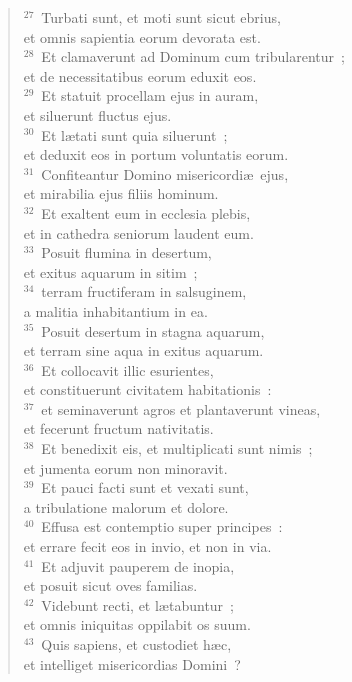 \begin{flushleft}
\begin{verse}
${}^{27}$~Turbati sunt, et moti sunt sicut ebrius,\\ et omnis sapientia eorum devorata est.\\
${}^{28}$~Et clamaverunt ad Dominum cum tribularentur~;\\ et de necessitatibus eorum eduxit eos.\\
${}^{29}$~Et statuit procellam ejus in auram,\\ et siluerunt fluctus ejus.\\
${}^{30}$~Et l\ae tati sunt quia siluerunt~;\\ et deduxit eos in portum voluntatis eorum.\\
${}^{31}$~Confiteantur Domino misericordi\ae\ ejus,\\ et mirabilia ejus filiis hominum.\\
${}^{32}$~Et exaltent eum in ecclesia plebis,\\ et in cathedra seniorum laudent eum.\\
${}^{33}$~Posuit flumina in desertum,\\ et exitus aquarum in sitim~;\\
${}^{34}$~terram fructiferam in salsuginem,\\ a malitia inhabitantium in ea.\\
${}^{35}$~Posuit desertum in stagna aquarum,\\ et terram sine aqua in exitus aquarum.\\
${}^{36}$~Et collocavit illic esurientes,\\ et constituerunt civitatem habitationis~:\\
${}^{37}$~et seminaverunt agros et plantaverunt vineas,\\ et fecerunt fructum nativitatis.\\
${}^{38}$~Et benedixit eis, et multiplicati sunt nimis~;\\ et jumenta eorum non minoravit.\\
${}^{39}$~Et pauci facti sunt et vexati sunt,\\ a tribulatione malorum et dolore.\\
${}^{40}$~Effusa est contemptio super principes~:\\ et errare fecit eos in invio, et non in via.\\
${}^{41}$~Et adjuvit pauperem de inopia,\\ et posuit sicut oves familias.\\
${}^{42}$~Videbunt recti, et l\ae tabuntur~;\\ et omnis iniquitas oppilabit os suum.\\
${}^{43}$~Quis sapiens, et custodiet h\ae c,\\ et intelliget misericordias Domini~?\end{verse}\end{flushleft}




